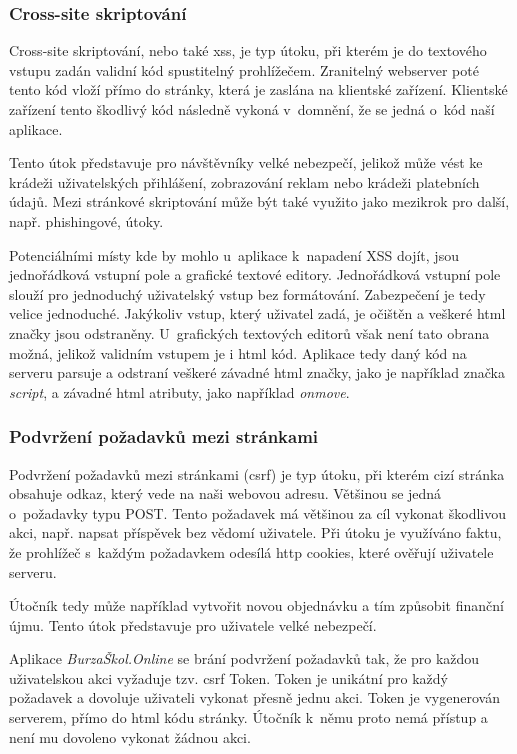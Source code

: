 \subsubsection{Cross-site skriptování}

Cross-site skriptování\cite{xss}, nebo také \acrshort{xss}, je typ útoku, při kterém je do textového vstupu zadán validní kód spustitelný prohlížečem. Zranitelný webserver poté tento kód vloží přímo do stránky, která je zaslána na klientské zařízení. Klientské zařízení tento škodlivý kód následně vykoná v~domnění, že se jedná o~kód naší aplikace.

Tento útok představuje pro návštěvníky velké nebezpečí, jelikož může vést ke krádeži uživatelských přihlášení, zobrazování reklam nebo krádeži platebních údajů.
Mezi stránkové skriptování\cite{xss} může být také využito jako mezikrok pro další, např. phishingové\cite{phishing}, útoky.

Potenciálními místy kde by mohlo u~aplikace \bso{} k~napadení XSS dojít, jsou jednořádková vstupní pole a grafické textové editory. Jednořádková vstupní pole slouží pro jednoduchý uživatelský vstup bez formátování. Zabezpečení je tedy velice jednoduché. Jakýkoliv vstup, který uživatel zadá, je očištěn a veškeré \acrshort{html} značky jsou odstraněny. U~grafických textových editorů však není tato obrana možná, jelikož validním vstupem je i \acrshort{html} kód. Aplikace tedy daný kód na serveru parsuje a odstraní veškeré závadné \acrshort{html} značky, jako je například značka \emph{script}, a závadné \acrshort{html} atributy, jako například \emph{onmove}.

\subsubsection{Podvržení požadavků mezi stránkami}

Podvržení požadavků mezi stránkami (\acrshort{csrf}) \cite{csrf} je typ útoku, při kterém cizí stránka obsahuje odkaz, který vede na naši webovou adresu. Většinou se jedná o~požadavky typu POST\@. Tento požadavek má většinou za cíl vykonat škodlivou akci, např. napsat příspěvek bez vědomí uživatele. Při útoku je využíváno faktu, že prohlížeč s~každým požadavkem odesílá \acrshort{http} cookies, které ověřují uživatele serveru.

Útočník tedy může například vytvořit novou objednávku a tím způsobit finanční újmu. Tento útok představuje pro uživatele velké nebezpečí.

Aplikace \emph{BurzaŠkol.Online} se brání podvržení požadavků tak, že pro každou uživatelskou akci vyžaduje tzv. \acrshort{csrf} Token\cite{csrf}. Token je unikátní pro každý požadavek a dovoluje uživateli vykonat přesně jednu akci. Token je vygenerován serverem, přímo do \acrshort{html} kódu stránky. Útočník k~němu proto nemá přístup a není mu dovoleno vykonat žádnou akci.

